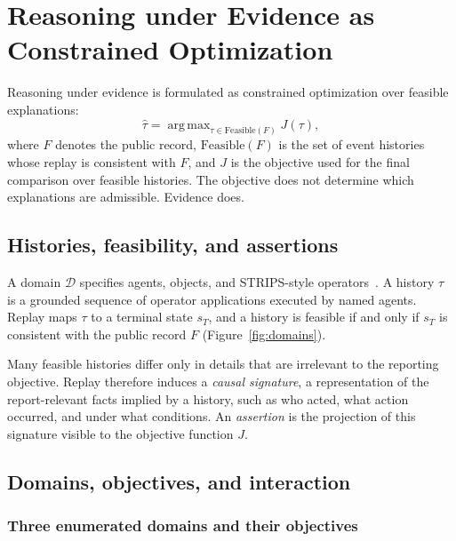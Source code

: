 \documentclass{article}
\newcommand{\Feas}{\mathrm{Feasible}}
\DeclareMathOperator*{\argmax}{arg\,max}
\begin{document}
\section{Reasoning under Evidence as Constrained Optimization}
\label{sec:framework}

Reasoning under evidence is formulated as constrained optimization over feasible explanations:
\begin{equation}
  \hat{\tau}
  =
  \argmax_{\tau\in\Feas(F)}
  J(\tau),
  \label{eq:general}
\end{equation}
where $F$ denotes the public record, $\Feas(F)$ is the set of event histories whose replay is consistent with $F$, and $J$ is the objective used for the final comparison over feasible histories. The objective does not determine which explanations are admissible. Evidence does.

\subsection{Histories, feasibility, and assertions}

A domain $\mathcal{D}$ specifies agents, objects, and STRIPS-style operators~\cite{fikes1971strips,ghallab2004planning}. A history $\tau$ is a grounded sequence of operator applications executed by named agents. Replay maps $\tau$ to a terminal state $s_T$, and a history is feasible if and only if $s_T$ is consistent with the public record $F$ (Figure~\ref{fig:domains}).

Many feasible histories differ only in details that are irrelevant to the reporting objective. Replay therefore induces a \emph{causal signature}, a representation of the report-relevant facts implied by a history, such as who acted, what action occurred, and under what conditions. An \emph{assertion} is the projection of this signature visible to the objective function $J$.

\subsection{Domains, objectives, and interaction}

\subsubsection{Three enumerated domains and their objectives}
\end{document}
